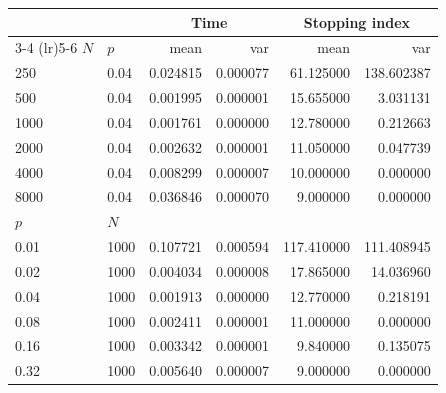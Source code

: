 \begin{tabular}{llrrrr}
      \toprule
      & & \multicolumn{2}{c}{Time} & \multicolumn{2}{c}{Stopping index} \\
      \cmidrule(lr){3-4} \cmidrule(lr){5-6}
      $N$ & $p$ & mean & var & mean & var \\
      \midrule
      250 & 0.04 & 0.024815 & 0.000077 & 61.125000 & 138.602387 \\
      500 & 0.04 & 0.001995 & 0.000001 & 15.655000 & 3.031131 \\
      1000 & 0.04 & 0.001761 & 0.000000 & 12.780000 & 0.212663 \\
      2000 & 0.04 & 0.002632 & 0.000001 & 11.050000 & 0.047739 \\
      4000 & 0.04 & 0.008299 & 0.000007 & 10.000000 & 0.000000 \\
      8000 & 0.04 & 0.036846 & 0.000070 & 9.000000 & 0.000000 \\
      \midrule
      $p$ & $N$ &  &  &  &  \\
      \midrule
      0.01 & 1000  & 0.107721 & 0.000594 & 117.410000 & 111.408945 \\
      0.02 & 1000  & 0.004034 & 0.000008 & 17.865000 & 14.036960 \\
      0.04 & 1000  & 0.001913 & 0.000000 & 12.770000 & 0.218191 \\
      0.08 & 1000  & 0.002411 & 0.000001 & 11.000000 & 0.000000 \\
      0.16 & 1000  & 0.003342 & 0.000001 & 9.840000 & 0.135075 \\
      0.32 & 1000  & 0.005640 & 0.000007 & 9.000000 & 0.000000 \\
      \bottomrule
\end{tabular}
